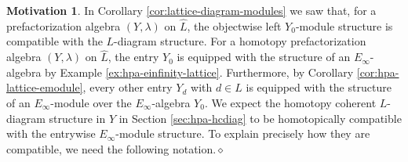\documentclass[11pt]{amsbook}
\numberwithin{section}{chapter}
\numberwithin{subsection}{section}
\numberwithin{equation}{section}
\theoremstyle{plain}
\theoremstyle{definition}
\newtheorem{motivation}[equation]{Motivation}
\newcommand{\dqed}{\hfill$\diamond$}
\newcommand{\Lhat}{\widehat{L}}
\begin{document}
\begin{motivation} In Corollary \ref{cor:lattice-diagram-modules} we saw that, for a prefactorization algebra $(Y,\lambda)$ on $\Lhat$, the objectwise left $Y_0$-module structure is compatible with the $L$-diagram structure.  For a homotopy prefactorization algebra $(Y,\lambda)$ on $\Lhat$, the entry $Y_0$ is equipped with the structure of an $E_\infty$-algebra by Example \ref{ex:hpa-einfinity-lattice}.  Furthermore, by Corollary \ref{cor:hpa-lattice-emodule}, every other entry $Y_d$ with $d\in L$ is equipped with the structure of an $E_\infty$-module over the $E_\infty$-algebra $Y_0$.   We expect the homotopy coherent $L$-diagram structure in $Y$ in Section \ref{sec:hpa-hcdiag} to be homotopically compatible with the entrywise $E_\infty$-module structure.  To explain precisely how they are compatible, we need the following notation.\dqed
\end{motivation}
\end{document}
